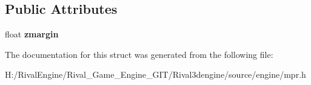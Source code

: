 \subsection*{Public Attributes}
\begin{DoxyCompactItemize}
\item 
\mbox{\label{structmpr_1_1_ent_cylinder_a86b002f1e3a20229d5e241e90ca3a6b0}} 
float {\bfseries zmargin}
\end{DoxyCompactItemize}


The documentation for this struct was generated from the following file\+:\begin{DoxyCompactItemize}
\item 
H\+:/\+Rival\+Engine/\+Rival\+\_\+\+Game\+\_\+\+Engine\+\_\+\+G\+I\+T/\+Rival3dengine/source/engine/mpr.\+h\end{DoxyCompactItemize}
